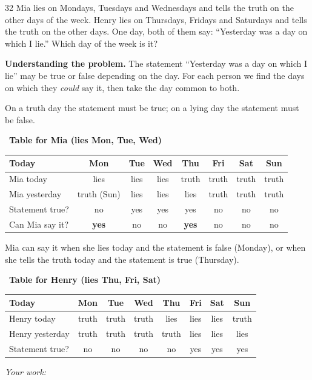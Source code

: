 \documentclass[11pt]{article}
\newif\ifsol \solfalse
\newenvironment{probbox}[2]{\begin{probboxT}{#1}{#2}}{\end{probboxT}}
\newcommand{\StuProb}[2]{\begin{probboxS}{#1}{#2}\StuProbBody\end{probboxS}}
\newcommand{\probsol}[1]{%
  \begin{lrbox}{\solmeasure}\begin{minipage}{\dimexpr\linewidth-24pt\relax}#1\end{minipage}\end{lrbox}%
  \ifsol
    \begin{solbox}#1\end{solbox}%
  \else
    \setlength{\solht}{\dimexpr\ht\solmeasure+\dp\solmeasure+0.85cm\relax}%
    \ifdim\solht<1.35cm\setlength{\solht}{1.35cm}\fi
    \ifdim\solht>\StudentMaxWork\setlength{\solht}{\StudentMaxWork}\fi
    \par\noindent\begin{minipage}{\linewidth}%
    \expandafter\StuProb\StuProbArgs
    \begin{tcolorbox}[colback=white,colframe=Line,boxrule=0.8pt,arc=5pt,
      left=8pt,right=8pt,top=4pt,bottom=4pt,height=\solht]{\footnotesize\color{Slate}\itshape\WorkWord}\end{tcolorbox}%
    \end{minipage}\par\medskip
  \fi}
\newlength{\StudentMaxWork}\setlength{\StudentMaxWork}{4.5cm}
\newcommand{\step}[2]{\par\smallskip\noindent{\bfseries\color{tmBlue!85!black}\StepWord~#1.}\ {\bfseries #2}\par\nopagebreak}
\def\WorkWord{Your work:}
\def\StepWord{Step}
\begin{document}

\begin{probbox}{32}{\relax}
Mia lies on Mondays, Tuesdays and Wednesdays and tells the truth on the other days of the week. Henry lies on Thursdays, Fridays and
Saturdays and tells the truth on the other days. One day, both of them say: ``Yesterday was a day on which I lie.'' Which day of the
week is it?
\end{probbox}
\probsol{
\textbf{Understanding the problem.} The statement ``Yesterday was a day on which I lie'' may be true or false depending on the day.
For each person we find the days on which they \emph{could} say it, then take the day common to both.
\begin{recallbox}On a truth day the statement must be true; on a lying day the statement must be false.\end{recallbox}
\step{1}{Table for Mia (lies Mon, Tue, Wed)}
\begin{center}\small
\begin{tabular}{|l|c|c|c|c|c|c|c|}
\hline
\rowcolor{tmBlue!10} Today & Mon & Tue & Wed & Thu & Fri & Sat & Sun\\ \hline
Mia today & lies & lies & lies & truth & truth & truth & truth\\ \hline
Mia yesterday & truth (Sun) & lies & lies & lies & truth & truth & truth\\ \hline
Statement true? & no & yes & yes & yes & no & no & no\\ \hline
Can Mia say it? & \textbf{yes} & no & no & \textbf{yes} & no & no & no\\ \hline
\end{tabular}
\end{center}
Mia can say it when she lies today and the statement is false (Monday), or when she tells the truth today and the statement is true
(Thursday).
\step{2}{Table for Henry (lies Thu, Fri, Sat)}
\begin{center}\small
\begin{tabular}{|l|c|c|c|c|c|c|c|}
\hline
\rowcolor{tmBlue!10} Today & Mon & Tue & Wed & Thu & Fri & Sat & Sun\\ \hline
Henry today & truth & truth & truth & lies & lies & lies & truth\\ \hline
Henry yesterday & truth & truth & truth & truth & lies & lies & lies\\ \hline
Statement true? & no & no & no & no & yes & yes & yes\\ \hline

\end{tabular}
\end{center}}
\end{document}
